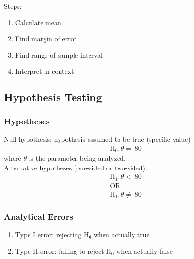 \documentclass[12pt]{article}
\numberwithin{equation}{section}
\begin{document}
Steps:
\begin{enumerate}
    \item Calculate mean
    \item Find margin of error
    \item Find range of sample interval
    \item Interpret in context
\end{enumerate}

\subsection{Hypothesis Testing}


\subsubsection{Hypotheses}
Null hypothesis: hypothesis assumed to be true (specific value)
\begin{gather}
    \text{H}_0 : \theta = .80
\end{gather}
where $\theta$ is the parameter being analyzed. \\[0.5cm]
Alternative hypotheses (one-sided or two-sided):
\begin{gather}
    \text{H}_1 : \theta < .80 \\
    \text{OR} \\
    \text{H}_1 : \theta \neq .80
\end{gather}

\subsubsection{Analytical Errors}
\begin{enumerate}
    \item Type I error: rejecting H$_0$ when actually true
    \item Type II error: failing to reject H$_0$ when actually false
\end{enumerate}
\end{document}
